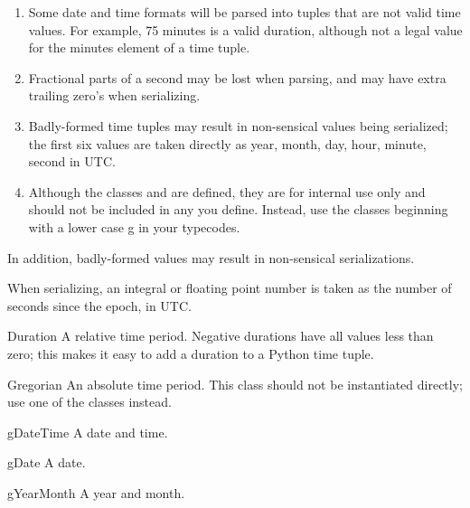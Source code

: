 \begin{enumerate}

\item
Some date and time formats will be parsed into tuples that are
not valid time values.
For example, 75 minutes is a valid duration, although not a legal value
for the minutes element of a time tuple.

\item
Fractional parts of a second may be lost when parsing, and may have
extra trailing zero's when serializing.

\item
Badly-formed time tuples may result in non-sensical values being serialized;
the first six values are taken directly as year, month, day, hour, minute,
second in UTC.

\item
Although the classes  and  are defined, they 
are for internal use only and should not be included in any 
you define.  Instead, use the classes beginning with a lower case g in your
typecodes.

\end{enumerate}

In addition, badly-formed values may result in non-sensical serializations.

When serializing, an integral or floating point number is taken as
the number of seconds since the epoch, in UTC.

\begin{classdesc}{Duration}{}
A relative time period.
Negative durations have all values less than zero; this makes
it easy to add a duration to a Python time tuple.
\end{classdesc}

\begin{classdesc}{Gregorian}{}
An absolute time period.
This class should not be instantiated directly; use one of the 
classes instead.
\end{classdesc}

\begin{classdesc}{gDateTime}{}
A date and time.
\end{classdesc}

\begin{classdesc}{gDate}{}
A date.
\end{classdesc}

\begin{classdesc}{gYearMonth}{}
A year and month.
\end{classdesc}

